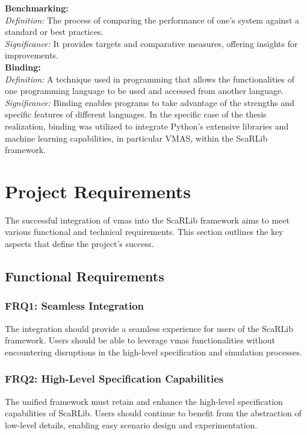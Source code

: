 \documentclass[12pt,a4paper,openright,twoside]{book}
\begin{document}
\textbf{Benchmarking:}\\
\textit{Definition:} The process of comparing the performance of one's system against a standard or best practices.\\
\textit{Significance:} It provides targets and comparative measures, offering insights for improvements.\\

\textbf{Binding:}\\
\textit{Definition:} A technique used in programming that allows the functionalities of one programming language to be used and accessed from another language.\\
\textit{Significance:} Binding enables programs to take advantage of the strengths and specific features of different languages. In the specific case of the thesis realization, binding was utilized to integrate Python's extensive libraries and machine learning capabilities, in particular VMAS, within the ScaRLib framework.\\

\section{Project Requirements}

The successful integration of \ac{vmas} into the ScaRLib framework aims to meet various functional and technical requirements. This section outlines the key aspects that define the project's success.

\subsection{Functional Requirements}

\subsubsection{FRQ1: Seamless Integration}
The integration should provide a seamless experience for users of the ScaRLib framework. Users should be able to leverage \ac{vmas} functionalities without encountering disruptions in the high-level specification and simulation processes.

\subsubsection{FRQ2: High-Level Specification Capabilities}
The unified framework must retain and enhance the high-level specification capabilities of ScaRLib. Users should continue to benefit from the abstraction of low-level details, enabling easy scenario design and experimentation.
\end{document}
